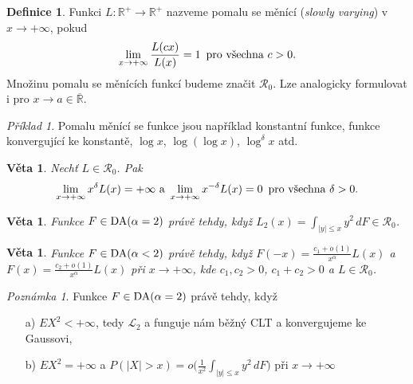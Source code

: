 \documentclass{article}
\newtheorem{theorem}[subsubsection]{Věta}
\theoremstyle{remark}
\newtheorem*{remark}{Poznámka}
\theoremstyle{plain}
\theoremstyle{definition}
\newtheorem{definition}[subsubsection]{Definice}
\theoremstyle{remark}
\newtheorem*{example}{Příklad}
\begin{document}
\begin{definition}
Funkci $L:\mathbb{R}^+\rightarrow\mathbb{R}^+$ nazveme pomalu se měnící (\textit{slowly varying}) v $x\rightarrow +\infty$, pokud
\begin{align*}
    \lim_{x\rightarrow +\infty} \frac{L(cx)}{L(x)}=1\,\textnormal{ pro všechna }c>0.
\end{align*}
Množinu pomalu se měnících funkcí budeme značit $\mathcal{R}_0$. Lze analogicky formulovat i pro $x\rightarrow a\in\overline{\mathbb{R}}$. 
\end{definition}

\begin{example}
Pomalu měnící se funkce jsou například konstantní funkce, funkce konvergující ke konstantě, $\log x$, $\log(\log x)$, $\log^\delta x$ atd. 
\end{example}

\begin{theorem}
Nechť $L\in\mathcal{R}_0$. Pak 
\begin{align*}
    \lim_{x\rightarrow+\infty}x^\delta L(x)=+\infty \textnormal{ a } \lim_{x\rightarrow+\infty}x^{-\delta} L(x)=0\,\textnormal{ pro všechna }\delta>0.
\end{align*}
\end{theorem}

\begin{theorem}
Funkce $F\in\textnormal{DA}(\alpha=2)$ právě tehdy, když $L_2(x)=\int_{|y|\leq x}y^2\,dF\in\mathcal{R}_0$.
\end{theorem}

\begin{theorem}
Funkce $F\in\textnormal{DA}(\alpha<2)$ právě tehdy, když $F(-x)=\frac{c_1+o(1)}{x^\alpha}L(x)$ a $F(x)=\frac{c_2+o(1)}{x^\alpha}L(x)$ při $x\rightarrow+\infty$, kde $c_1,c_2>0$, $c_1+c_2>0$ a $L\in\mathcal{R}_0$.
\end{theorem}

\begin{remark}
Funkce $F\in\textnormal{DA}(\alpha=2)$ právě tehdy, když
\begin{enumerate}
    \item[a)] $EX^2<+\infty$, tedy $\mathscr{L}_2$ a funguje nám běžný CLT a konvergujeme ke Gaussovi,
    \item[b)] $EX^2=+\infty$ a $P(|X|>x)=o\big(\frac{1}{x^2}\int_{|y|\leq x}y^2\,dF\big)$ při $x\rightarrow+\infty$
\end{enumerate}
\end{remark}
\end{document}
